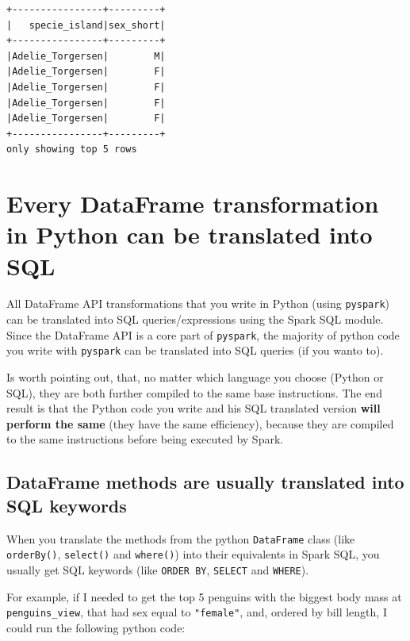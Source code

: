 \documentclass[
  11pt,
  letterpaper,
  DIV=11,
  numbers=noendperiod]{scrreprt}
\begin{document}
\begin{verbatim}
+----------------+---------+
|   specie_island|sex_short|
+----------------+---------+
|Adelie_Torgersen|        M|
|Adelie_Torgersen|        F|
|Adelie_Torgersen|        F|
|Adelie_Torgersen|        F|
|Adelie_Torgersen|        F|
+----------------+---------+
only showing top 5 rows
\end{verbatim}

\hypertarget{every-dataframe-transformation-in-python-can-be-translated-into-sql}{%
\section{Every DataFrame transformation in Python can be translated into
SQL}\label{every-dataframe-transformation-in-python-can-be-translated-into-sql}}

All DataFrame API transformations that you write in Python (using
\texttt{pyspark}) can be translated into SQL queries/expressions using
the Spark SQL module. Since the DataFrame API is a core part of
\texttt{pyspark}, the majority of python code you write with
\texttt{pyspark} can be translated into SQL queries (if you wanto to).

Is worth pointing out, that, no matter which language you choose (Python
or SQL), they are both further compiled to the same base instructions.
The end result is that the Python code you write and his SQL translated
version \textbf{will perform the same} (they have the same efficiency),
because they are compiled to the same instructions before being executed
by Spark.

\hypertarget{dataframe-methods-are-usually-translated-into-sql-keywords}{%
\subsection{DataFrame methods are usually translated into SQL
keywords}\label{dataframe-methods-are-usually-translated-into-sql-keywords}}

When you translate the methods from the python \texttt{DataFrame} class
(like \texttt{orderBy()}, \texttt{select()} and \texttt{where()}) into
their equivalents in Spark SQL, you usually get SQL keywords (like
\texttt{ORDER\ BY}, \texttt{SELECT} and \texttt{WHERE}).

For example, if I needed to get the top 5 penguins with the biggest body
mass at \texttt{penguins\_view}, that had sex equal to
\texttt{"female"}, and, ordered by bill length, I could run the
following python code:
\end{document}
